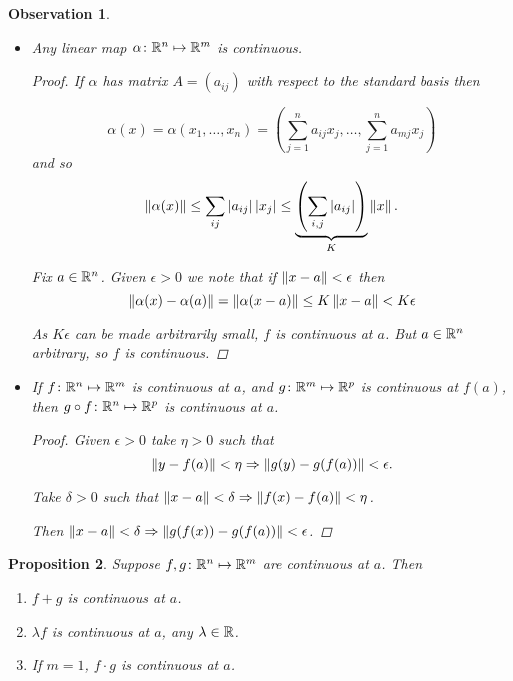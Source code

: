 \documentclass{notes}
\theoremstyle{plain}
\newtheorem{proposition}{Proposition}[chapter]
\newtheorem{observation}[proposition]{Observation}
\begin{document}
\begin{observation}
\

\begin{itemize}
\item Any linear map $ \alpha\colon  \mathbb{R}^{n} \mapsto \mathbb{R}^{m} $ is 
continuous.

\begin{proof}
If $ \alpha $ has matrix $ A=(a_{ij}) $ with respect to the 
standard basis then 

\[
\alpha(x) = \alpha(x_{1}, \ldots, x_{n})
= \left(\sum_{j=1}^{n}a_{ij}x_{j},\ldots, \sum_{j=1}^{n}a_{mj}x_{j} \right)
\]
and so
\[
\left\|\alpha(x)\right\| \leq \sum_{ij}|a_{ij}| \, |x_{j}| \leq 
\underbrace{\left(\sum_{i,j}|a_{ij}|\right)}_{K}\left\|x\right\|.
\]

Fix $ a \in \mathbb{R}^{n} $. Given $ \epsilon > 0 $ we note that if $ 
\left\|x-a\right\| < \epsilon $ then \[ \left\|\alpha(x)-\alpha(a)\right\| = 
\left\|\alpha(x-a)\right\| \leq K \left\|x-a\right\| < K \epsilon \]

As $ K\epsilon $ can be made arbitrarily small, $ f $ is 
continuous at $ a $. But $ a \in \mathbb{R}^{n} $ arbitrary, so $ f $ 
is continuous.
\end{proof}

\item If $ f\colon\mathbb{R}^{n}\mapsto \mathbb{R}^{m} $ is continuous at $ a $, 
and $ g\colon\mathbb{R}^{m} \mapsto \mathbb{R}^{p} $ is continuous at $ f(a) $, 
then $ g \circ f\colon\mathbb{R}^{n} \mapsto \mathbb{R}^{p} $ is continuous at $ a $.
\begin{proof}
Given $ \epsilon>0 $ take $ \eta>0 $ such that
\[ \left\|y - f(a)\right\| < \eta \Rightarrow 
\left\|g(y)-g(f(a))\right\| < \epsilon. \]

Take $ \delta > 0 $ such that $\left\|x-a\right\|<\delta \Rightarrow 
\left\|f(x)-f(a)\right\|<\eta$.

Then $\left\|x-a\right\| < \delta \Rightarrow 
\left\|g(f(x))-g(f(a))\right\| < \epsilon$.
\end{proof}
\end{itemize}
\end{observation}

\begin{proposition}
Suppose $ f,g\colon \mathbb{R}^{n} \mapsto \mathbb{R}^{m}  $ are continuous at $ a $. 
Then
\begin{enumerate}
\item $ f+g $ is continuous at $ a $.
\item $ \lambda f $ is continuous at $ a $, any $ \lambda \in \mathbb{R} $.
\item If $ m = 1 $, $ f \cdot g $ is continuous at $ a $.
\end{enumerate}
\end{proposition}
\end{document}
